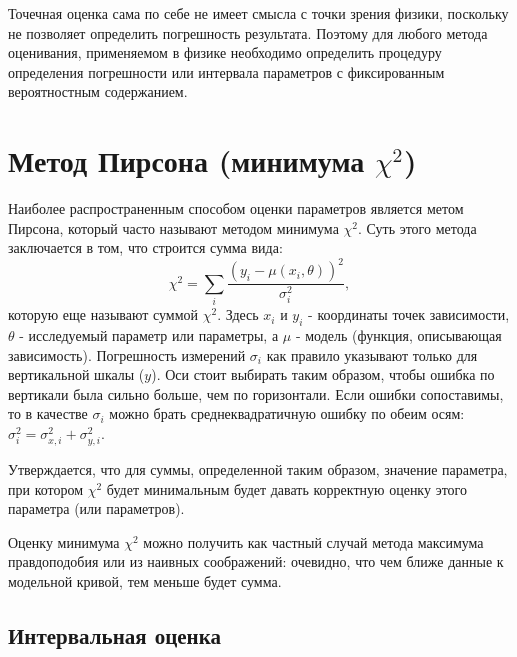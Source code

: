 Точечная оценка сама по себе не имеет смысла с точки зрения физики, поскольку не
позволяет определить погрешность результата. Поэтому для любого метода
оценивания, применяемом в физике необходимо определить процедуру определения
погрешности или интервала параметров с фиксированным вероятностным содержанием.

\section{Метод Пирсона (минимума \texorpdfstring{$\chi^{2}$}{chi2})}
\label{sec:chi2}

Наиболее распространенным способом оценки параметров является метом Пирсона,
который часто называют методом минимума $\chi^2$. Суть этого метода заключается
в том, что строится сумма вида:
\begin{equation}
    \chi^2 = \sum_i{\frac{(y_i - \mu(x_i,\theta))^2}{\sigma_i^2}},
\end{equation}
которую еще называют суммой $\chi^2$. Здесь $x_i$ и $y_i$ - координаты точек
зависимости, $\theta$ - исследуемый параметр или параметры, а $\mu$ - модель
(функция, описывающая зависимость). Погрешность измерений $\sigma_i$ как правило
указывают только для вертикальной шкалы ($y$). Оси стоит выбирать таким образом,
чтобы ошибка по вертикали была сильно больше, чем по горизонтали. Если ошибки
сопоставимы, то в качестве $\sigma_i$ можно брать среднеквадратичную ошибку по
обеим осям: $\sigma_i^2 = \sigma_{x,i}^2 + \sigma_{y,i}^2$.

Утверждается, что для суммы, определенной таким образом, значение параметра, при
котором $\chi^2$ будет минимальным будет давать корректную оценку этого
параметра (или параметров).

Оценку минимума $\chi^2$ можно получить как частный случай метода максимума
правдоподобия или из наивных соображений: очевидно, что чем ближе данные к
модельной кривой, тем меньше будет сумма.


\subsection{Интервальная оценка}

